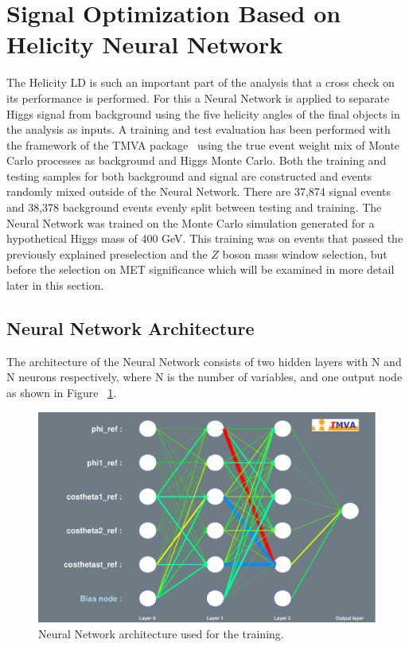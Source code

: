 
\section{Signal Optimization Based on Helicity Neural Network}
The Helicity LD is such an important part of the analysis that a cross check on its performance is performed.  For this a Neural Network is applied to separate Higgs signal from background using the five helicity angles of the final objects in the analysis as inputs. A training and test evaluation has been performed with the framework of the TMVA package~\cite{tmva} using the true event weight mix of Monte Carlo processes as background and Higgs Monte Carlo. Both the training and testing samples for both background and signal are constructed and events randomly mixed outside of the Neural Network.  There are 37,874 signal events and 38,378 background events evenly split between testing and training.  The Neural Network was trained on the Monte Carlo simulation generated for a hypothetical Higgs mass of 400 GeV. This training was on events that passed the previously explained preselection and the $Z$ boson mass window selection, but before the selection on MET significance which will be examined in more detail later in this section.


\subsection{Neural Network Architecture}
The architecture of the Neural Network consists of two hidden layers with N and N neurons respectively, where N is the number of variables, and one output node as shown in Figure ~\ref{fig:NNarch}.



\begin{figure}[htb!]
\begin{center}
\centerline{
\includegraphics[width=0.6\linewidth]{Optimization/plots/NN/nn_network_architecture.pdf}
}
\caption{
Neural Network architecture used for the training.
}
\label{fig:NNarch}
\end{center}
\end{figure}


